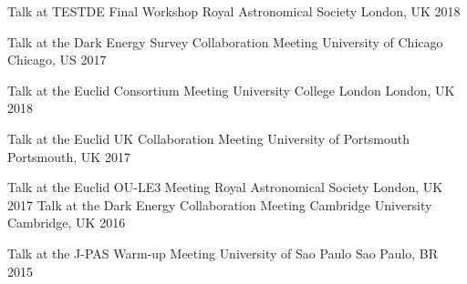 \begin{cvhonors}
  \cvhonor
    {Talk at TESTDE Final Workshop} %
    {Royal Astronomical Society} %
    {London, UK} %
    {2018} %

  \cvhonor
    {Talk at the Dark Energy Survey Collaboration Meeting} %
    {University of Chicago} %
    {Chicago, US} %
    {2017} %

  \cvhonor
    {Talk at the Euclid Consortium Meeting} %
    {University College London} %
    {London, UK} %
    {2018} %


\cvhonor
    {Talk at the Euclid UK Collaboration Meeting} %
    {University of Portsmouth} %
    {Portsmouth, UK} %
    {2017} %

  \cvhonor
    {Talk at the Euclid OU-LE3 Meeting} %
    {Royal Astronomical Society} %
    {London, UK} %
    {2017} %
  \cvhonor
    {Talk at the Dark Energy Collaboration Meeting} %
    {Cambridge University} %
    {Cambridge, UK} %
    {2016} %

  \cvhonor
    {Talk at the J-PAS Warm-up Meeting} %
    {University of Sao Paulo} %
    {Sao Paulo, BR} %
    {2015} %

\end{cvhonors}
